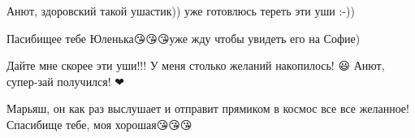 
Анют, здоровский такой ушастик)) уже готовлюсь тереть эти уши :-))

\begin{itemize} %

Пасибищее тебе Юленька😘😘😘уже жду чтобы увидеть его на Софие)
\end{itemize} %


Дайте мне скорее эти уши!!! У меня столько желаний накопилось! 😃 Анют,
супер-зай получился! ❤

\begin{itemize} %

Марьяш, он как раз выслушает и отправит прямиком в космос все все желанное!
Спасибище тебе, моя хорошая😘😘😘

\end{itemize} %
